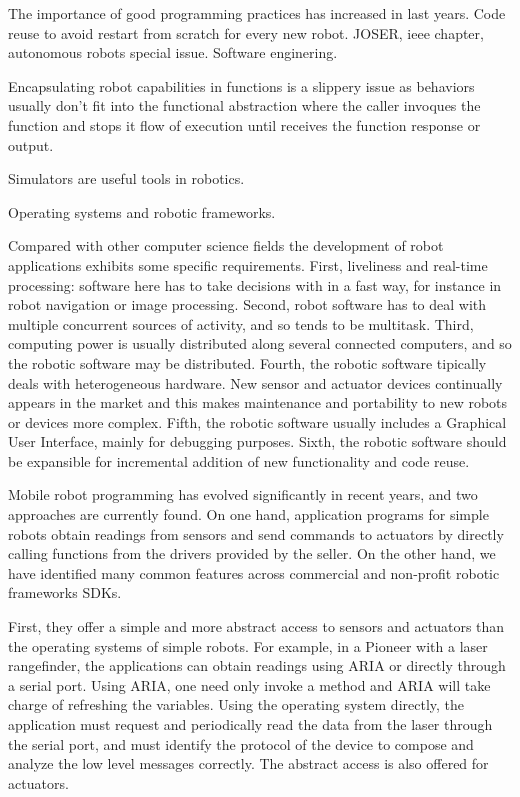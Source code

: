 \documentclass[twocolumn]{svjour3}          %
\begin{document}
The importance of good programming practices has increased in last years. Code reuse to avoid restart from scratch for every new robot. JOSER, ieee chapter, autonomous robots special issue. Software enginering.

Encapsulating robot capabilities in functions is a slippery issue as behaviors usually don't fit into the functional abstraction where the caller invoques the function and stops it flow of execution until receives the function response or output.

Simulators are useful tools in robotics.

Operating systems and robotic frameworks.

Compared with other computer science fields the development of robot applications exhibits some specific requirements. First, liveliness and real-time processing: software here has to take decisions with in a fast way, for instance in robot navigation or image processing. Second, robot software has to deal with multiple concurrent sources of activity, and so tends to be multitask. Third, computing power is usually distributed along several connected computers, and so the robotic software may be distributed. Fourth, the robotic software tipically deals with heterogeneous hardware. New sensor and actuator devices continually appears in the market and this makes maintenance and portability to new robots or devices more complex. Fifth, the robotic software usually includes a Graphical User Interface, mainly for debugging purposes. Sixth, the robotic software should be expansible for incremental addition of new functionality and code reuse.

Mobile robot programming has evolved significantly in recent years, and two approaches are currently found. On one hand, application programs for simple robots obtain readings from sensors and send commands to actuators by directly calling functions from the drivers provided by the seller. On the other hand, we have identified many common features across commercial and non-profit robotic frameworks SDKs.

First, they offer a simple and more abstract access to sensors and actuators than the operating systems of simple robots. For example, in a Pioneer with a laser rangefinder, the applications can obtain readings using ARIA or directly through a serial port. Using ARIA, one need only invoke a method and ARIA will take charge of refreshing the variables. Using the operating system directly, the application must request and periodically read the data from the laser through the serial port, and must identify the protocol of the
device to compose and analyze the low level messages correctly. The abstract access is also offered for actuators.
\end{document}
